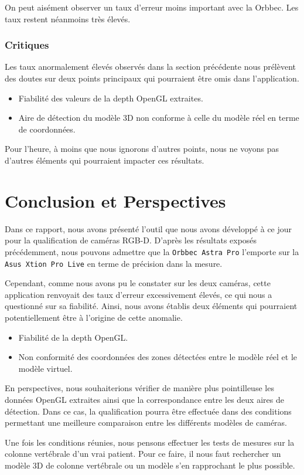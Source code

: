 \documentclass[a4paper, 12pt]{book}
\begin{document}
\vspace{2cm} 
\par On peut aisément observer un taux d'erreur moins important avec la Orbbec.
Les taux restent néanmoins très élevés.

\subsection{Critiques}
\par Les taux anormalement élevés observés dans la section précédente nous prélèvent des doutes sur deux points principaux qui pourraient être omis dans l'application.
\begin{itemize}
		\item {Fiabilité des valeurs de la depth OpenGL extraites.}	
		\item {Aire de détection du modèle 3D non conforme à celle du modèle réel en terme de coordonnées.} 		
\end{itemize}

\par Pour l'heure, à moins que nous ignorons d'autres points, nous ne voyons pas d'autres éléments qui pourraient impacter ces résultats. 


\chapter{Conclusion et Perspectives\label{chap-conclusion}}
\par Dans ce rapport, nous avons présenté l'outil que nous avons développé à ce jour pour la qualification de caméras RGB-D. D'après les résultats exposés précédemment, nous pouvons admettre que la \texttt{Orbbec Astra Pro} l'emporte sur la \texttt{Asus Xtion Pro Live} en terme de précision dans la mesure. 
\par Cependant, comme nous avons pu le constater sur les deux caméras, cette application renvoyait des taux d'erreur excessivement élevés, ce qui nous a questionné sur sa fiabilité. Ainsi, nous avons établis deux éléments qui pourraient potentiellement être à l'origine de cette anomalie. 
\begin{itemize}
		\item {Fiabilité de la depth OpenGL.}	
		\item {Non conformité des coordonnées des zones détectées entre le modèle réel et le modèle virtuel.} 		
\end{itemize} 

\vspace{0.5cm}
\par En perspectives, nous souhaiterions vérifier de manière plus pointilleuse les données OpenGL extraites ainsi que la correspondance entre les deux aires de détection.
Dans ce cas, la qualification pourra être effectuée dans des conditions permettant une meilleure comparaison entre les différents modèles de caméras.  
\par Une fois les conditions réunies, nous pensons effectuer les tests de mesures sur la colonne vertébrale d'un vrai patient. Pour ce faire, il nous faut rechercher un modèle 3D de colonne vertébrale ou un modèle s'en rapprochant le plus possible. 	
\end{document}
